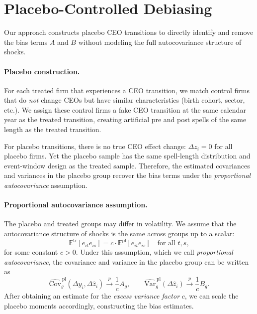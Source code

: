 \documentclass[11pt,a4paper]{article}
\newcommand{\Var}{\text{Var}}
\newcommand{\Cov}{\text{Cov}}
\begin{document}
\section{Placebo-Controlled Debiasing} 

Our approach constructs placebo CEO transitions to directly identify and remove the bias terms $A$ and $B$ without modeling the full autocovariance structure of shocks.

\paragraph{Placebo construction.} For each treated firm that experiences a CEO transition, we match control firms that do \emph{not} change CEOs but have similar characteristics (birth cohort, sector, etc.). We assign these control firms a fake CEO transition at the same calendar year as the treated transition, creating artificial pre and post spells of the same length as the treated transition.

For placebo transitions, there is no true CEO effect change: $\Delta z_i = 0$ for all placebo firms. Yet the placebo sample has the same spell-length distribution and event-window design as the treated sample. Therefore, the estimated covariances and variances in the placebo group recover the bias terms under the \emph{proportional autocovariance} assumption.

\paragraph{Proportional autocovariance assumption.} The placebo and treated groups may differ in volatility. We assume that the autocovariance structure of shocks is the same across groups up to a scalar: 
\begin{equation}
  \mathbb{E}^{\text{tr}}[e_{it} e_{is}] = c \cdot \mathbb{E}^{\text{pl}}[e_{it} e_{is}] \quad \text{for all } t,s,
\end{equation}
for some constant $c>0$. Under this assumption, which we call \emph{proportional autocovariance}, the covariance and variance in the placebo group can be written as 
\begin{equation}
\widehat{\Cov}_g^{\,\text{pl}}(\Delta y_i,\Delta \hat z_i) \xrightarrow{p} \frac{1}{c} A_g,\qquad \widehat{\Var}_g^{\,\text{pl}}(\Delta \hat z_i) \xrightarrow{p} \frac{1}{c} B_g.
\end{equation}
After obtaining an estimate for the \emph{excess variance factor} $c$, we can scale the placebo moments accordingly,  constructing the bias estimates.
\end{document}
